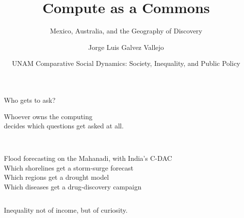 \documentclass[aspectratio=169,11pt]{beamer}
\title{Compute as a Commons}
\subtitle{Mexico, Australia, and the Geography of Discovery}
\author{Jorge Luis Galvez Vallejo}
\institute{National Computational Infrastructure (NCI), Australia}
\date{UNAM \textbullet{} Comparative Social Dynamics: Society, Inequality, and Public Policy}
\begin{document}
\maketitle

\begin{frame}{Who gets to ask?}
\begin{center}
{\Large Whoever owns the computing\\[2pt] decides \alert{which questions get asked at all.}}
\end{center}
\vspace{1.2em}
\begin{columns}[T]
\\[2pt]\small Flood forecasting on the Mahanadi, with India's C-DAC
\\[2pt]\small Which shorelines get a storm-surge forecast
\\[2pt]\small Which regions get a drought model
\\[2pt]\small Which diseases get a drug-discovery campaign
\end{columns}
\vspace{1.2em}
\begin{center}\color{mute}Inequality not of income, but of \alert{curiosity}.\end{center}
\end{frame}
\end{document}
